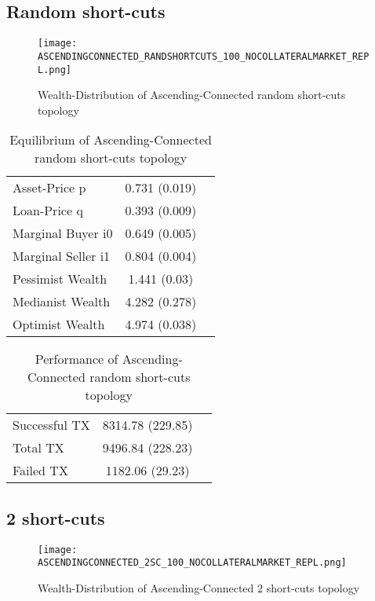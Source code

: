 \documentclass[Bachelorarbeit.tex]{subfiles}
\begin{document}
\subsection{Random short-cuts}
\begin{figure}[H]
	\centering
  \texttt{[image: ASCENDINGCONNECTED\_RANDSHORTCUTS\_100\_NOCOLLATERALMARKET\_REPL.png]}
	\caption{Wealth-Distribution of Ascending-Connected random short-cuts topology}
	\label{fig:wealth_ASCENDINGCONNECTED_RANDSHORTCUTS_100_NOCOLLATERALMARKET_REPL}
\end{figure}

\begin{table}[h]
	\caption{Equilibrium of Ascending-Connected random short-cuts topology}
	\centering
	\begin{tabular} { l c r }
		\hline
		Asset-Price p & 0.731 (0.019) \\
		Loan-Price q & 0.393 (0.009) \\
		Marginal Buyer i0 & 0.649 (0.005) \\
		Marginal Seller i1 & 0.804 (0.004) \\
		\hline
		Pessimist Wealth & 1.441 (0.03) \\
		Medianist Wealth & 4.282 (0.278) \\
		Optimist Wealth & 4.974 (0.038) \\
		\hline
	\end{tabular}
\end{table} 

\begin{table}[h]
	\caption{Performance of Ascending-Connected random short-cuts topology}
	\centering
	\begin{tabular} { l c r }
		\hline
		Successful TX & 8314.78 (229.85) \\
		Total TX & 9496.84 (228.23) \\
		Failed TX & 1182.06 (29.23) \\
		\hline
	\end{tabular}
\end{table}

\subsection{2 short-cuts}
\begin{figure}[H]
	\centering
  \texttt{[image: ASCENDINGCONNECTED\_2SC\_100\_NOCOLLATERALMARKET\_REPL.png]}
	\caption{Wealth-Distribution of Ascending-Connected 2 short-cuts topology}
	\label{fig:wealth_ASCENDINGCONNECTED_2SC_100_NOCOLLATERALMARKET_REPL}
\end{figure}
\end{document}
